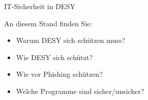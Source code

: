\documentclass[final]{beamer}
\begin{document}
\begin{frame}[t]
\begin{columns}[t]
\begin{column}{0.95\textwidth}
\begin{block}{IT-Sicherheit in DESY}
\end{block}

\begin{block}{\Huge {An diesem Stand finden Sie:}}

\Huge{
\begin{center}
\begin{itemize}
    \centering 
    \item [] Warum DESY sich schützen muss?
    \item [] Wie DESY sich schützt?
    \item [] Wie vor Phishing schützen?
    \item [] Welche Programme sind sicher/unsicher?
\end{itemize}
\end{center}
}

\end{block}

\end{column}

\end{columns} %


\end{frame} %
\end{document}
